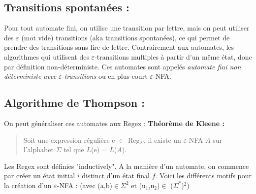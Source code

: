 \documentclass{article}
\begin{document}
\subsection{Transitions spontanées :}
Pour tout automate fini, on utilise une transition par lettre, mais on peut utiliser des $\varepsilon$ (mot vide) transitions (aka transitions spontanées), ce qui permet de prendre des transitions sans lire de lettre.\newline
Contrairement aux automates, les algorithmes qui utilisent des $\varepsilon$-transitions multiples à partir d'un même état, donc par définition non-déterministe. Ces automates sont appelés \textit{automate fini non déterministe avec $\varepsilon$-transitions} ou en plus court $\varepsilon$-NFA.\newline
\subsection{Algorithme de Thompson :}
On peut généraliser ces automates aux Regex :\newline
\textbf{Théorème de Kleene :}
\begin{quote}
    Soit une expression régulière e $\in$ Reg$_{\Sigma}$, il existe un $\varepsilon$-NFA $A$ sur l'alphabet $\Sigma$ tel que $L$(e) = $L$($A$).\newline
\end{quote}
Les Regex sont définies "inductively".\newline
A la manière d'un automate, on commence par créer un état initial $i$ distinct d'un état final $f$.
Voici les différents motifs pour la création d'un $\varepsilon$-NFA : (avec (a,b)$\in \Sigma^{2}$ et (u$_{1}$,u$_{2}$)$\in$ ($\Sigma^{*}$)$^{2}$)
\end{document}
